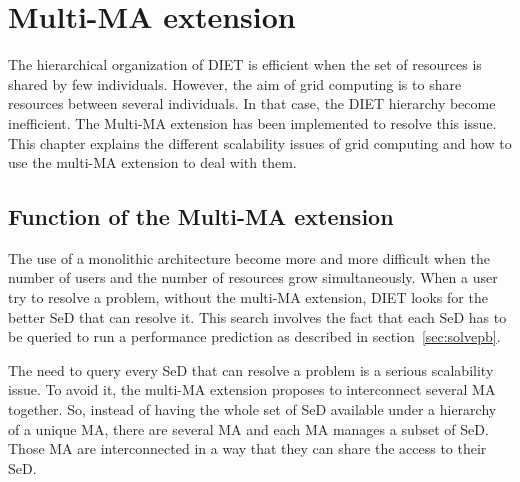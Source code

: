 \chapter{Multi-MA extension}
\label{ch:multiMAextension}

The hierarchical organization of DIET is efficient when the set of resources is
shared by few individuals. However, the aim of grid computing is to share
resources between several individuals. In that case, the DIET hierarchy become
inefficient. The Multi-MA extension has been implemented to resolve this
issue. This chapter explains the different scalability issues of grid computing
and how to use the multi-MA extension to deal with them.

\section{Function of the Multi-MA extension}

The use of a monolithic architecture become more and more difficult when the
number of users and the number of resources grow simultaneously. When a user
try to resolve a problem, without the multi-MA extension, DIET looks for the
better SeD that can resolve it. This search involves the fact that each SeD has
to be queried to run a performance prediction as described in
section~\ref{sec:solvepb}.

The need to query every SeD that can resolve a problem is a serious
scalability issue. To avoid it, the multi-MA extension proposes to interconnect
several MA together. So, instead of having the whole set of SeD available under
a hierarchy of a unique MA, there are several MA and each MA manages a
subset of SeD. Those MA are interconnected in a way that they can share the
access to their SeD.

